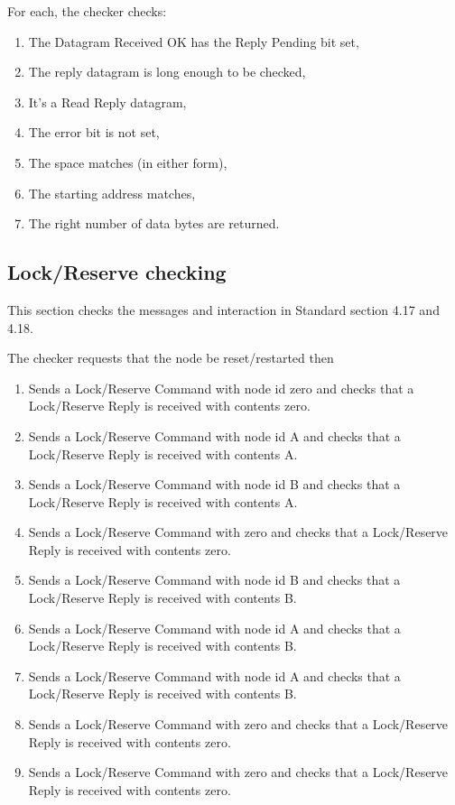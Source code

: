 For each, the checker checks:
\begin{enumerate}
\item The Datagram Received OK has the Reply Pending bit set,
\item The reply datagram is long enough to be checked,
\item It's a Read Reply datagram,
\item The error bit is not set,
\item The space matches (in either form),
\item The starting address matches,
\item The right number of data bytes are returned.
\end{enumerate}

\subsection{Lock/Reserve checking}

This section checks the messages and interaction in Standard section 4.17 and 4.18.

The checker requests that the node be reset/restarted then 

\begin{enumerate}
\item Sends a Lock/Reserve Command with node id zero
    and checks that a Lock/Reserve Reply is received with contents zero.
\item Sends a Lock/Reserve Command with node id A
    and checks that a Lock/Reserve Reply is received with contents A.
\item Sends a Lock/Reserve Command with node id B
    and checks that a Lock/Reserve Reply is received with contents A.
\item Sends a Lock/Reserve Command with zero 
    and checks that a Lock/Reserve Reply is received with contents zero.
\item Sends a Lock/Reserve Command with node id B
    and checks that a Lock/Reserve Reply is received with contents B.
\item Sends a Lock/Reserve Command with node id A
    and checks that a Lock/Reserve Reply is received with contents B.
\item Sends a Lock/Reserve Command with node id A
    and checks that a Lock/Reserve Reply is received with contents B.
\item Sends a Lock/Reserve Command with zero 
    and checks that a Lock/Reserve Reply is received with contents zero.
\item Sends a Lock/Reserve Command with zero 
    and checks that a Lock/Reserve Reply is received with contents zero.

\end{enumerate}

